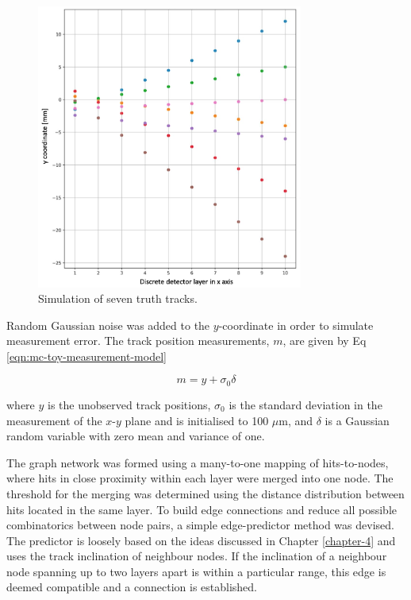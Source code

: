 \begin{figure}[htb]
    \centering
    \includegraphics[width=0.78\textwidth]{images/5-gnn-algorithm/ground-truth.png}
    \caption{Simulation of seven truth tracks.}
    \label{fig:ground-truth}%
\end{figure}

Random Gaussian noise was added to the $y$-coordinate in order to simulate measurement error. The track position measurements, $m$, are given by Eq \eqref{eqn:mc-toy-measurement-model}

\begin{equation}
m = y + \sigma_0 \delta
\label{eqn:mc-toy-measurement-model}
\end{equation}

where $y$ is the unobserved track positions, $\sigma_0$ is the standard deviation in the measurement of the $x$-$y$ plane and is initialised to 100 $\mu$m, and $\delta$ is a Gaussian random variable with zero mean and variance of one.

The graph network was formed using a many-to-one mapping of hits-to-nodes, where hits in close proximity within each layer were merged into one node. The threshold for the merging was determined using the distance distribution between hits located in the same layer. To build edge connections and reduce all possible combinatorics between node pairs, a simple edge-predictor method was devised. The predictor is loosely based on the ideas discussed in Chapter \ref{chapter-4} and uses the track inclination of neighbour nodes. If the inclination of a neighbour node spanning up to two layers apart is within a particular range, this edge is deemed compatible and a connection is established. 

